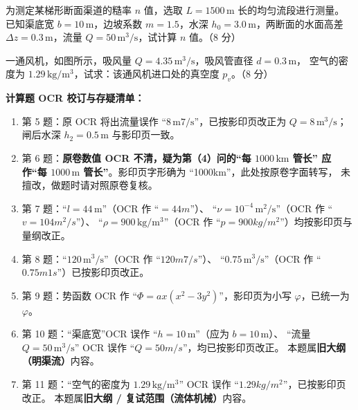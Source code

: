 \begin{ti}
  \item 为测定某梯形断面渠道的糙率 $n$ 值，选取 $L=1500\,\mathrm{m}$ 长的均匀流段进行测量。
  已知渠底宽 $b=10\,\mathrm{m}$，边坡系数 $m=1.5$，水深 $h_0=3.0\,\mathrm{m}$，两断面的水面高差
  $\Delta z=0.3\,\mathrm{m}$，流量 $Q=50\,\mathrm{m^3/s}$，试计算 $n$ 值。（8 分）\hfill{}

  \item 一通风机，如图所示，吸风量 $Q=4.35\,\mathrm{m^3/s}$，吸风管直径 $d=0.3\,\mathrm{m}$，
  空气的密度为 $1.29\,\mathrm{kg/m^3}$，试求：该通风机进口处的真空度 $p_v$。（8 分）\hfill{}
\end{ti}

\begin{tishi}
\textbf{计算题 OCR 校订与存疑清单：}
\begin{enumerate}
  \item 第 5 题：原 OCR 将出流量误作 ``$8\,\mathrm{m7/s}$''，已按影印页改正为
    $Q=8\,\mathrm{m^3/s}$；闸后水深 $h_2=0.5\,\mathrm{m}$ 与影印页一致。
  \item 第 6 题：\textbf{原卷数值 OCR 不清，疑为第（4）问的``每 $1000\,\mathrm{km}$ 管长''
    应作``每 $1000\,\mathrm{m}$ 管长''}。影印页字形确为 ``1000km''，此处按原卷字面转写，
    未擅改，做题时请对照原卷复核。
  \item 第 7 题：``$l=44\,\mathrm{m}$''（OCR 作 ``$=44m$''）、
    ``$\nu=10^{-4}\,\mathrm{m^2/s}$''（OCR 作 ``$v=104m^2/s$''）、
    ``$\rho=900\,\mathrm{kg/m^3}$''（OCR 作 ``$p=900kg/m^2$''）均按影印页与量纲改正。
  \item 第 8 题：``$120\,\mathrm{m^3/s}$''（OCR 作 ``$120m7/s$''）、
    ``$0.75\,\mathrm{m^3/s}$''（OCR 作 ``$0.75m1s$''）已按影印页改正。
  \item 第 9 题：势函数 OCR 作 ``$\Phi=ax(x^2-3y^2)$''，影印页为小写 $\varphi$，已统一为 $\varphi$。
  \item 第 10 题：``渠底宽''OCR 误作 ``$h=10\,\mathrm{m}$''（应为 $b=10\,\mathrm{m}$）、
    ``流量 $Q=50\,\mathrm{m^3/s}$'' OCR 误作 ``$Q=50m/s$''，均已按影印页改正。
    本题属\textbf{旧大纲（明渠流）}内容。
  \item 第 11 题：``空气的密度为 $1.29\,\mathrm{kg/m^3}$'' OCR 误作 ``$1.29kg/m^2$''，已按影印页改正。
    本题属\textbf{旧大纲 / 复试范围（流体机械）}内容。
\end{enumerate}
\end{tishi}
